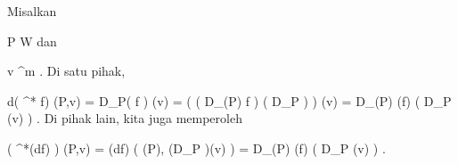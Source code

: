 Misalkan

\mavergleichskette
{\vergleichskette
{ P
}
{ \in }{  W
}
{  }{
}
{    }{
}
{   }{
}
}
{}{}{}
dan

\mavergleichskette
{\vergleichskette
{ v
}
{ \in }{  \R^m
}
{  }{
}
{    }{
}
{   }{
}
}
{}{}{.}
Di satu pihak,

\mavergleichskettedisp
{\vergleichskette
{ d( \psi^* f) (P,v)
}
{ =} { D_P( f \circ \psi) (v)
}
{ =} { \left(  \left(  D_{\psi(P)} f  \right)  \circ \left(  D_P  \psi  \right)  \right) (v)
}
{ =} { D_{\psi(P)} (f) \left(  D_P \psi(v)  \right)
}
{ } {
}
}
{}{}{.}
Di pihak lain, kita juga memperoleh

\mavergleichskettedisp
{\vergleichskette
{ \left(  \psi^*(df)  \right) (P,v)
}
{ =} { (df) \left(  \psi(P), (D_P \psi )(v)  \right)
}
{ =} { D_{\psi(P)} (f) \left(  D_P \psi (v)  \right)
}
{ } {
}
{ } {
}
}
{}{}{.}
